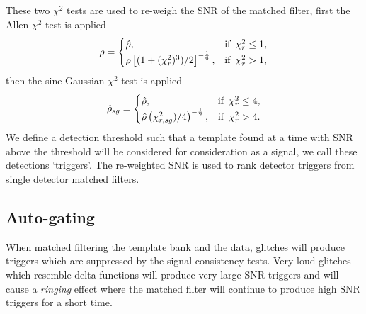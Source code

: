 These two $\chi^{2}$ tests are used to re-weigh the SNR of the matched filter, first the Allen $\chi^{2}$ test is applied~\cite{McIsaac_Chi:2022}
%
\begin{equation}
    \rho =
    \begin{cases}
        \hat{\rho}, & \text{if \,} \chi^{2}_{r} \le 1, \\
        \rho\left[(1 + (\chi^{2}_{r})^{3}) /2\right]^{-\frac{1}{6}}, & \text{if \,} \chi^{2}_{r} > 1,
    \end{cases}
\end{equation}
%
then the sine-Gaussian $\chi^{2}$ test is applied
%
\begin{equation}
    \hat{\rho}_{sg} =
    \begin{cases}
        \hat{\rho}, & \text{if \,} \chi^{2}_{r} \le 4, \\
        \hat{\rho}\left(\chi^{2}_{r, sg})/4\right)^{-\frac{1}{2}}, & \text{if \,} \chi^{2}_{r} > 4.
    \end{cases}
\end{equation}
%
We define a detection threshold such that a template found at a time with SNR above the threshold will be considered for consideration as a \gwadj signal, we call these detections `triggers'. The re-weighted SNR is used to rank detector triggers from single detector matched filters.

\subsection{\label{2:sec:auto-gating}Auto-gating}

When matched filtering the template bank and the data, glitches will produce triggers which are suppressed by the signal-consistency tests. Very loud glitches which resemble delta-functions will produce very large SNR triggers and will cause a \textit{ringing} effect where the matched filter will continue to produce high SNR triggers for a short time.

